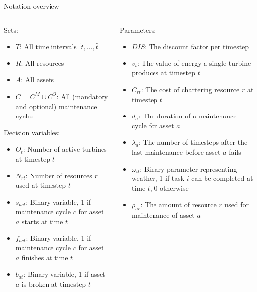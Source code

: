 \documentclass{beamer}
\begin{document}
\begin{frame}{Notation overview}
\scriptsize

\begin{columns}
\begin{column}{.48\textwidth}
Sets:
\begin{itemize}
\item $T$: All time intervals [$\dot{t}, \dots , \hat{t}$]
\item $R$: All resources
\item $A$: All assets
\item $C = C^M \cup C^O$: All (mandatory and optional) maintenance cycles
\end{itemize}

Decision variables:
\begin{itemize}
\item $O_{t}$: Number of active turbines at timestep $t$
\item $N_{rt}$: Number of resources $r$ used at timestep $t$
\item $s_{act}$: Binary variable, 1 if maintenance cycle $c$ for asset $a$ starts at time $t$
\item $f_{act}$: Binary variable, 1 if maintenance cycle $c$ for asset $a$ finishes at time $t$
\item $b_{at}$: Binary variable, 1 if asset $a$ is broken at timestep $t$
\end{itemize}
\end{column}

\hfill

\begin{column}{.48\textwidth}
Parameters:
\begin{itemize}
\item $DIS$: The discount factor per timestep
\item $v_t$: The value of energy a single turbine produces at timestep $t$
\item $C_{rt}$: The cost of chartering resource $r$ at timestep $t$
\item $d_a$: The duration of a maintenance cycle for asset $a$
\item $\lambda_a$: The number of timesteps after the last maintenance before asset $a$ fails
\item $\omega_{it}$: Binary parameter representing weather, 1 if task $i$ can be completed at time $t$, 0 otherwise
\item $\rho_{ar}$: The amount of resource $r$ used for maintenance of asset $a$
\end{itemize}
\end{column}
\end{columns}

\end{frame}
\end{document}
